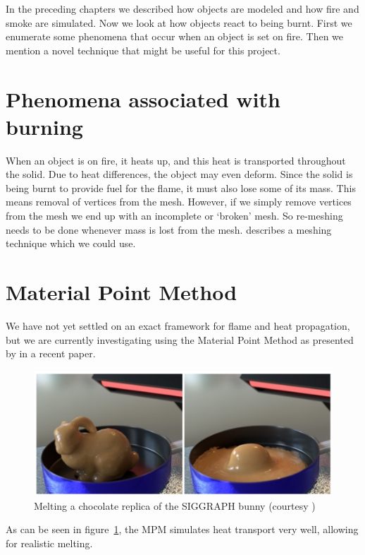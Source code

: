 \documentclass[12pt]{report}
\begin{document}
In the preceding chapters we described how objects are modeled and how fire and smoke are simulated. Now we look at how objects react to being burnt. First we enumerate some phenomena that occur when an object is set on fire. Then we mention a novel technique that might be useful for this project.

\section{Phenomena associated with burning}

When an object is on fire, it heats up, and this heat is transported throughout the solid. Due to heat differences, the object may even deform. Since the solid is being burnt to provide fuel for the flame, it must also lose some of its mass. This means removal of vertices from the mesh. However, if we simply remove vertices from the mesh we end up with an incomplete or `broken' mesh. So re-meshing needs to be done whenever mass is lost from the mesh. \cite{loirgufe} describes a meshing technique which we could use.

\section{Material Point Method}

We have not yet settled on an exact framework for flame and heat propagation, but we are currently investigating using the Material Point Method as presented by \cite{stomahkin} in a recent paper.

\begin{figure}[H]
\centering
\includegraphics[width=\linewidth]{img/bunnymelt}
\caption{Melting a chocolate replica of the SIGGRAPH bunny (courtesy \cite{stomahkin})}
\label{fig:bunny_figure}
\end{figure}

As can be seen in figure~\ref{fig:bunny_figure}, the MPM simulates heat transport very well, allowing for realistic melting.
\end{document}
